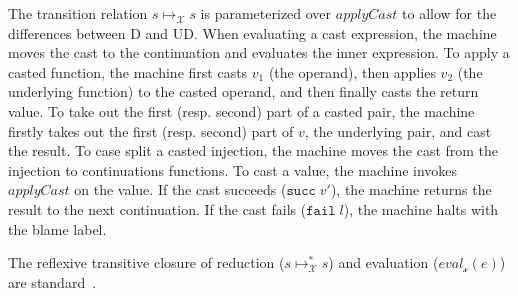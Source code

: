 \documentclass[acmsmall,review]{acmart}\settopmatter{printfolios=true,printccs=false,printacmref=false}
\newcommand{\rOOsucc}[1]{\mathtt{succ}\;#1}
\newcommand{\rOOfail}[1]{\mathtt{fail}\;#1}
\newcommand{\judgeCreduce}[2]{#1 \longmapsto_{\mathcal{X}} #2}
\newcommand{\judgeCreduceTrans}[2]{#1 \longmapsto_{\mathcal{X}}^{*} #2}
\begin{document}
The transition relation $\judgeCreduce{s}{s}$ is parameterized over
$applyCast$ to allow for the differences between D and UD.
%
When evaluating a cast expression, the machine moves the cast to the
continuation and evaluates the inner expression.
To apply a casted function, the machine first casts $v_1$ (the operand), then
applies $v_2$ (the underlying function) to the casted operand, and then finally
casts the return value.
%
To take out the first (resp. second) part of a casted pair, the
machine firstly takes out the first (resp. second) part of $v$, the
underlying pair, and cast the result.
%
%
To case split a casted injection, the machine moves the cast from
the injection to continuations functions.
%
To cast a value, the machine invokes $applyCast$ on the value. If the cast 
succeeds ($\rOOsucc{v'}$), the machine returns the result to the next
continuation.  If the cast fails ($\rOOfail{l}$), the machine halts with the 
blame label.

%

The reflexive transitive closure of reduction ($\judgeCreduceTrans{s}{s}$) and 
evaluation ($eval_\mathcal{x}(e)$) are standard~\citep{felleisen03:_pllc}.
\end{document}
